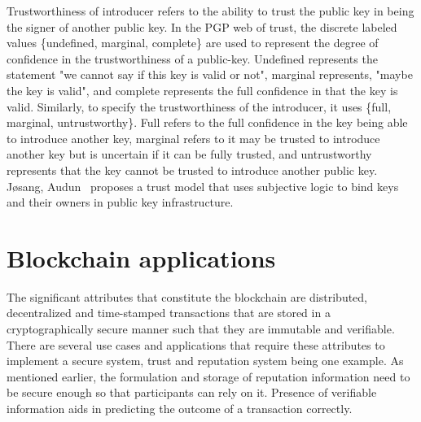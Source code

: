 Trustworthiness of introducer refers to the ability to trust the public key in
being the signer of another public key.  In the PGP web of trust, the discrete
labeled values \{undefined, marginal, complete\} are used to represent the
degree of confidence in the trustworthiness of a public-key. Undefined
represents the statement "we cannot say if this key is valid or not", marginal
represents, "maybe the key is valid", and complete represents the full
confidence in that the key is valid.  Similarly, to specify the trustworthiness
of the introducer, it uses \{full, marginal, untrustworthy\}. Full refers to
the full confidence in the key being able to introduce another key, marginal
refers to it may be trusted to introduce another key but is uncertain if it can
be fully trusted, and untrustworthy represents that the key cannot be trusted
to introduce another public key. Jøsang, Audun~\cite{josang1999algebra}
proposes a trust model that uses subjective logic to bind keys and their owners
in public key infrastructure.  

\section{Blockchain applications}
The significant attributes that constitute the blockchain are distributed,
decentralized and time-stamped transactions that are stored in a
cryptographically secure manner such that they are immutable and verifiable.
There are several use cases and applications that require these attributes to
implement a secure system, trust and reputation system being one example. As
mentioned earlier, the formulation and storage of reputation information need
to be secure enough so that participants can rely on it. Presence of verifiable
information aids in predicting the outcome of a transaction correctly. \par 

